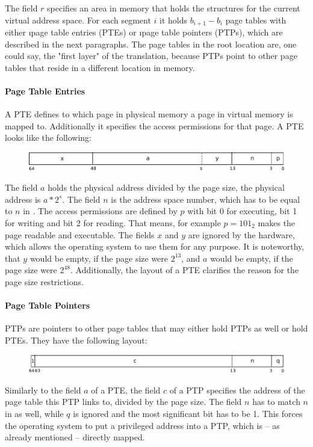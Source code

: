 The field $r$ specifies an area in memory that holds the  structures for the current virtual address space. For each segment $i$ it holds $b_{i+1} - b_i$ page tables with either \i{page table entries} (PTEs) or \i{page table pointers} (PTPs), which are described in the next paragraphs. The page tables in the root location are, one could say, the "first layer" of the translation, because PTPs point to other page tables that reside in a different location in memory.

\paragraph{Page Table Entries}

A PTE defines to which page in physical memory a page in virtual memory is mapped to. Additionally it specifies the access permissions for that page. A PTE looks like the following:
\begin{figure}[H]
	\centering
	\includegraphics[width=\textwidth]{img/PTE-crop.pdf}
\end{figure}
\vspace{-20pt}
\noindent The field $a$ holds the physical address divided by the page size, \ie the physical address is $a * 2^s$. The field $n$ is the address space number, which has to be equal to $n$ in . The access permissions are defined by $p$ with bit 0 for executing, bit 1 for writing and bit 2 for reading. That means, for example $p=101_2$ makes the page readable and executable. The fields $x$ and $y$ are ignored by the hardware, which allows the operating system to use them for any purpose. \citep[pg. 36]{mmix-doc} It is noteworthy, that $y$ would be empty, if the page size were $2^{13}$, and $a$ would be empty, if the page size were $2^{48}$. Additionally, the layout of a PTE clarifies the reason for the page size restrictions.

\paragraph{Page Table Pointers}

PTPs are pointers to other page tables that may either hold PTPs as well or hold PTEs. They have the following layout:
\begin{figure}[H]
	\centering
	\includegraphics[width=\textwidth]{img/PTP-crop.pdf}
\end{figure}
\vspace{-20pt}
\noindent Similarly to the field $a$ of a PTE, the field $c$ of a PTP specifies the address of the page table this PTP links to, divided by the page size. The field $n$ has to match $n$ in  as well, while $q$ is ignored and the most significant bit has to be 1. This forces the operating system to put a privileged address into a PTP, which is -- as already mentioned -- directly mapped. \citep[pg. 36]{mmix-doc}

